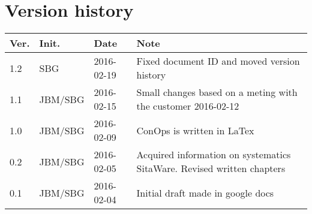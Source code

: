 \chapter*{Version history}
\label{app:rev_his}

\begin{tabular}{b{1cm} b{2cm} b{2cm} b{7cm}}
    \textbf{Ver.} & \textbf{Init.} & \textbf{Date} & \textbf{Note} \\
    \hline 
    1.2  & SBG		& 2016-02-19 & Fixed document ID and moved version history\\
    1.1  & JBM/SBG	& 2016-02-15 & Small changes based on a meting with the customer 2016-02-12\\
    1.0  & JBM/SBG	& 2016-02-09 & ConOps is written in LaTex \\
    0.2  & JBM/SBG	& 2016-02-05 & Acquired information on systematics SitaWare. Revised written chapters \\
    0.1  & JBM/SBG	& 2016-02-04 & Initial draft made in google docs \\
\end{tabular}